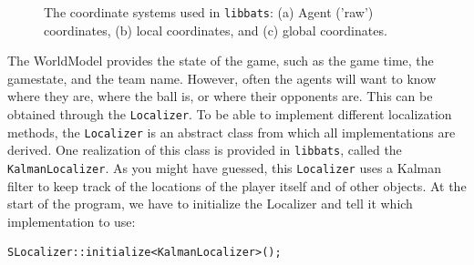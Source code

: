\begin{figure}
\centering
{}
\caption{The coordinate systems used in {\tt libbats}: (a) Agent
  ('raw') coordinates, (b) local coordinates, and (c) global
  coordinates.}
\label{coordinates}
\end{figure}

The WorldModel provides the state of the game, such as the game time,
the gamestate, and the team name. However, often the agents will want
to know where they are, where the ball is, or where their opponents
are. This can be obtained through the {\tt Localizer}. To be able to
implement different localization methods, the {\tt Localizer} is an
abstract class from which all implementations are derived. One
realization of this class is provided in {\tt libbats}, called the
{\tt KalmanLocalizer}. As you might have guessed, this {\tt Localizer}
uses a Kalman filter to keep track of the locations of the player
itself and of other objects. At the start of the program, we have to
initialize the Localizer and tell it which implementation to use:
\begin{lstlisting}[frame=single]
SLocalizer::initialize<KalmanLocalizer>();
\end{lstlisting}

